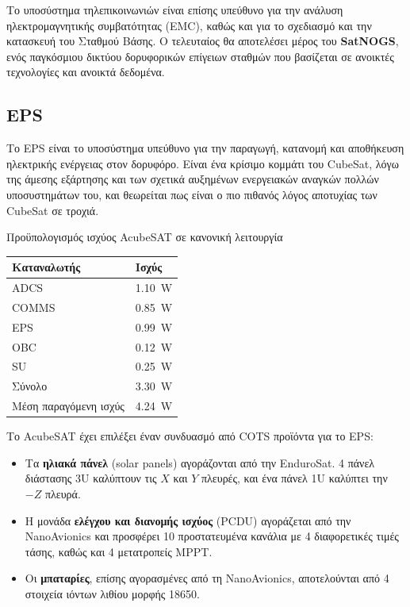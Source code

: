\documentclass[a4paper,nobib]{tufte-book}
\begin{document}
Το υποσύστημα τηλεπικοινωνιών είναι επίσης υπεύθυνο για την ανάλυση ηλεκτρομαγνητικής συμβατότητας (\acs{EMC}), καθώς και για το σχεδιασμό και την κατασκευή του Σταθμού Βάσης. Ο τελευταίος θα αποτελέσει μέρος του \textbf{SatNOGS}\autocite{white_overview_satellite_2018}, ενός παγκόσμιου δικτύου δορυφορικών επίγειων σταθμών που βασίζεται σε ανοικτές τεχνολογίες και ανοικτά δεδομένα.

\subsection{\acf{EPS}}

Το \ac{EPS} είναι το υποσύστημα υπεύθυνο για την παραγωγή, κατανομή και αποθήκευση ηλεκτρικής ενέργειας στον δορυφόρο. Είναι ένα κρίσιμο κομμάτι του CubeSat, λόγω της άμεσης εξάρτησης και των σχετικά αυξημένων ενεργειακών αναγκών πολλών υποσυστημάτων του, και θεωρείται πως είναι ο πιο πιθανός λόγος αποτυχίας των CubeSat σε τροχιά. \autocite{langer_reliability_cubesats_2016}

\begin{margintable}
	\caption{Προϋπολογισμός ισχύος AcubeSAT σε κανονική λειτουργία}
	\label{tab:power_budget}
	\begin{tabularx}{\linewidth}{@{}lX@{}}
		\toprule
		\textbf{Καταναλωτής}            & \textbf{Ισχύς}            \\ \midrule
		\acs{ADCS}          & \SI{1.10}{\watt} \\
		\acs{COMMS}         & \SI{0.85}{\watt} \\
		\acs{EPS}           & \SI{0.99}{\watt} \\
		\acs{OBC}           & \SI{0.12}{\watt} \\
		\acs{SU}            & \SI{0.25}{\watt} \\ \midrule
		Σύνολο               & \SI{3.30}{\watt} \\
		Μέση παραγόμενη ισχύς & \SI{4.24}{\watt} \\ \bottomrule
	\end{tabularx}
\end{margintable}

Το AcubeSAT έχει επιλέξει έναν συνδυασμό από \ac{COTS} προϊόντα για το \ac{EPS}:\autocite{DDJF_SYS}
\begin{itemize}
	\item Τα \textbf{ηλιακά πάνελ} (solar panels) αγοράζονται από την EnduroSat. 4 πάνελ διάστασης 3U καλύπτουν τις \(X\) και \(Y\) πλευρές, και ένα πάνελ 1U καλύπτει την \(-Z\) πλευρά.
	\item Η μονάδα \textbf{ελέγχου και διανομής ισχύος} (\acs{PCDU}) αγοράζεται από την NanoAvionics και προσφέρει 10 προστατευμένα κανάλια με 4 διαφορετικές τιμές τάσης, καθώς και 4 μετατροπείς \acs{MPPT}.
	\item Οι \textbf{μπαταρίες}, επίσης αγορασμένες από τη NanoAvionics, αποτελούνται από 4 στοιχεία ιόντων λιθίου μορφής 18650.
\end{itemize}
\end{document}
